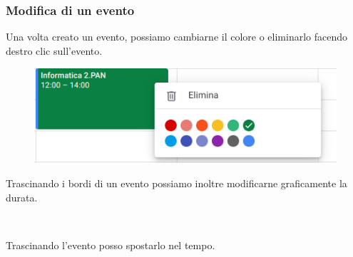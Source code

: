 \documentclass[handout]{beamer}
\begin{document}
\begin{frame}
\frametitle{Modifica di un evento}
Una volta creato un evento, possiamo cambiarne il colore o eliminarlo facendo destro clic sull'evento.

\begin{figure}
  \includegraphics[width=.6\columnwidth]{img/calendarcolore.png}
\end{figure}

Trascinando i bordi di un evento possiamo inoltre modificarne graficamente la durata.

~

Trascinando l'evento posso spostarlo nel tempo.
\end{frame}
\end{document}

